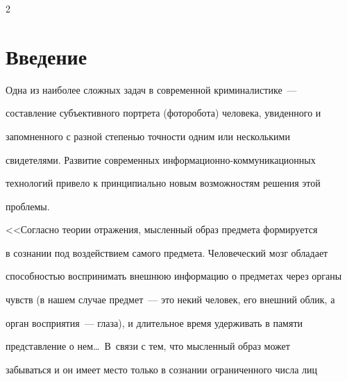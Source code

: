 






      \thispagestyle{headings}





      \begin{multicols}{2}





      \label{st\stat}


     


\section{Введение}


     


     Одна из наиболее сложных задач в современной криминалистике~--- 


составление субъективного портрета (фоторобота) человека, увиденного и 


запомненного с разной степенью точности одним или несколькими 


свидетелями. Развитие современных информационно-коммуникационных 


технологий привело к принципиально новым возможностям решения этой 


проблемы. 


     


     <<Согласно теории отражения, мысленный образ предмета формируется 


в сознании под воздействием самого предмета. Человеческий мозг обладает 


способностью воспринимать внешнюю информацию о предметах через органы 


чувств (в нашем случае предмет~--- это некий человек, его внешний облик, а 


орган восприятия~--- глаза), и длительное время удерживать в памяти 


представление о нем\ldots\ В~связи с тем, что мысленный образ может 


забываться и он имеет место только в сознании ограниченного числа лиц 



\end{multicols}
